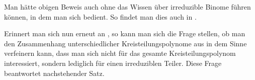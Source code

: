\begin{bemerkung}
  Man hätte obigen Beweis auch ohne das Wissen über irreduzible Binome führen
  können, in dem man sich  bedient. So
  findet man dies auch in \autocite[Lemma 22.2]{hachenberger1997finite}.
\end{bemerkung}



Erinnert man sich nun erneut an , so
kann man sich die Frage stellen, ob man den
Zusammenhang unterschiedlicher Kreisteilungspolynome aus 
in dem Sinne verfeinern kann, dass man sich nicht für das gesamte 
Kreisteilungspolynom interessiert, sondern lediglich für einen irreduziblen
Teiler. Diese Frage beantwortet nachstehender Satz.


